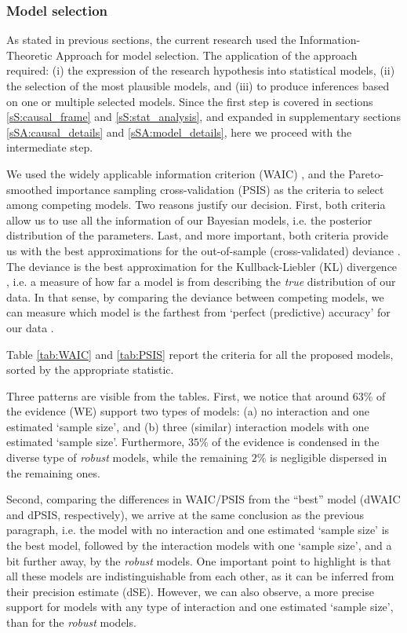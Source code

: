 \subsubsection{Model selection} \label{ssSA:model_selection}
%
As stated in previous sections, the current research used the Information-Theoretic Approach \citep{Anderson_2008, Chamberlain_1965} for model selection. The application of the approach required: (i) the expression of the research hypothesis into statistical models, (ii) the selection of the most plausible models, and (iii) to produce inferences based on one or multiple selected models. Since the first step is covered in sections \ref{sS:causal_frame} and \ref{sS:stat_analysis}, and expanded in supplementary sections \ref{sSA:causal_details} and \ref{sSA:model_details}, here we proceed with the intermediate step. 

We used the widely applicable information criterion (WAIC) \citep{Watanabe_2013}, and the Pareto-smoothed importance sampling cross-validation (PSIS) \citep{Vehtari_et_al_2021} as the criteria to select among competing models. Two reasons justify our decision. First, both criteria allow us to use all the information of our Bayesian models, i.e. the posterior distribution of the parameters. Last, and more important, both criteria provide us with the best approximations for the out-of-sample (cross-validated) deviance \citep{McElreath_2020}. The deviance is the best approximation for the Kullback-Liebler (KL) divergence \citep{Kullback_et_al_1951}, i.e. a measure of how far a model is from describing the \textit{true} distribution of our data. In that sense, by comparing the deviance between competing models, we can measure which model is the farthest from `perfect (predictive) accuracy' for our data \cite{McElreath_2020}.

Table \ref{tab:WAIC} and \ref{tab:PSIS} report the criteria for all the proposed models, sorted by the appropriate statistic. 

Three patterns are visible from the tables. First, we notice that around $63\%$ of the evidence (WE) support two types of models: (a) no interaction and one estimated `sample size', and (b) three (similar) interaction models with one estimated `sample size'. Furthermore, $35\%$ of the evidence is condensed in the diverse type of \textit{robust} models, while the remaining $2\%$ is negligible dispersed in the remaining ones.

Second, comparing the differences in WAIC/PSIS from the ``best'' model (dWAIC and dPSIS, respectively), we arrive at the same conclusion as the previous paragraph, i.e. the model with no interaction and one estimated `sample size' is the best model, followed by the interaction models with one `sample size', and a bit further away, by the \textit{robust} models. One important point to highlight is that all these models are indistinguishable from each other, as it can be inferred from their precision estimate (dSE). However, we can also observe, a more precise support for models with any type of interaction and one estimated `sample size', than for the \textit{robust} models.

